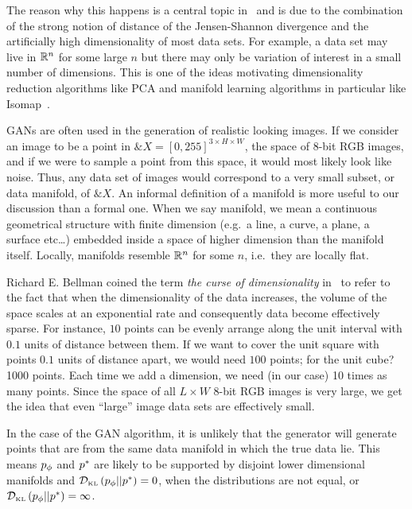 
The reason why this happens is a central topic
in~\cite{ref:arjovsky-towards-2017} and is due to the combination of the strong
notion of distance of the Jensen-Shannon divergence and the artificially high
dimensionality of most data sets. For example, a data set may live in $\mathbb{R}^n$ for
some large $n$ but there may only be variation of interest in a small number of
dimensions. This is one of the ideas motivating dimensionality reduction
algorithms like PCA and manifold learning algorithms in particular like
Isomap~\cite{ref:tenenbaum-2000}.

GANs are often used in the generation of realistic looking images. If we
consider an image to be a point in $\&X = {[0, 255]}^{3 \times H \times W}$, the
space of 8-bit RGB images, and if we were to sample a point from this space, it
would most likely look like noise. Thus, any data set of images would correspond
to a very small subset, or data manifold, of $\&X$. An informal definition of a
manifold is more useful to our discussion than a formal one. When we say
\textnormal{\sffamily manifold}, we mean a continuous geometrical structure with
finite dimension (e.g.\ a line, a curve, a plane, a surface etc\dots) embedded
inside a space of higher dimension than the manifold itself. Locally, manifolds
resemble $\mathbb{R}^n$ for some $n$, i.e.\ they are locally flat.

Richard E. Bellman coined the term \textit{the curse of dimensionality}
in~\cite{ref:bellman-1957} to refer to the fact that when the dimensionality of
the data increases, the volume of the space scales at an exponential rate and
consequently data become effectively sparse. For instance, $10$ points can be
evenly arrange along the unit interval with $0.1$ units of distance between
them. If we want to cover the unit square with points $0.1$ units of distance
apart, we would need $100$ points; for the unit cube? 1000 points. Each time we
add a dimension, we need (in our case) 10 times as many points. Since the space
of all $L \times W$ 8-bit RGB images is very large, we get the idea that even
``large'' image data sets are effectively small.

In the case of the GAN algorithm, it is unlikely that the generator will
generate points that are from the same data manifold in which the true data lie.
This means $p_{\phi}$ and $p^*$ are likely to be supported by disjoint lower
dimensional manifolds and $\mathcal{D}_{\text{\tiny KL}}\left( p_{\phi} \middle| \middle| p^* \right) = 0$, when the distributions are not
equal, or $\mathcal{D}_{\text{\tiny KL}}\left( p_{\phi} \middle| \middle| p^* \right) = \infty$.

